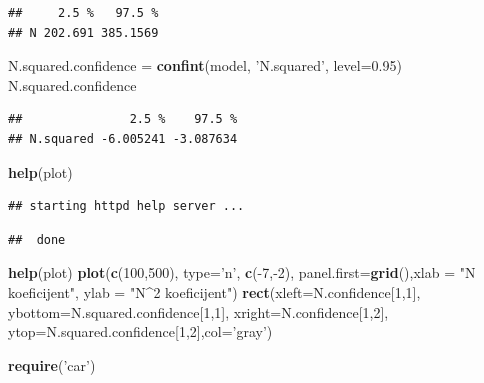 \documentclass[]{article}
\newenvironment{Shaded}{\begin{snugshade}}{\end{snugshade}}
\newcommand{\KeywordTok}[1]{\textcolor[rgb]{0.13,0.29,0.53}{\textbf{{#1}}}}
\newcommand{\DataTypeTok}[1]{\textcolor[rgb]{0.13,0.29,0.53}{{#1}}}
\newcommand{\DecValTok}[1]{\textcolor[rgb]{0.00,0.00,0.81}{{#1}}}
\newcommand{\FloatTok}[1]{\textcolor[rgb]{0.00,0.00,0.81}{{#1}}}
\newcommand{\StringTok}[1]{\textcolor[rgb]{0.31,0.60,0.02}{{#1}}}
\newcommand{\NormalTok}[1]{{#1}}
\begin{document}
\begin{verbatim}
##     2.5 %   97.5 %
## N 202.691 385.1569
\end{verbatim}

\begin{Shaded}
\begin{Highlighting}[]
\NormalTok{N.squared.confidence =}\StringTok{ }\KeywordTok{confint}\NormalTok{(model, }\StringTok{'N.squared'}\NormalTok{, }\DataTypeTok{level=}\FloatTok{0.95}\NormalTok{)}
\NormalTok{N.squared.confidence}
\end{Highlighting}
\end{Shaded}

\begin{verbatim}
##               2.5 %    97.5 %
## N.squared -6.005241 -3.087634
\end{verbatim}

\begin{Shaded}
\begin{Highlighting}[]
\KeywordTok{help}\NormalTok{(plot)}
\end{Highlighting}
\end{Shaded}

\begin{verbatim}
## starting httpd help server ...
\end{verbatim}

\begin{verbatim}
##  done
\end{verbatim}

\begin{Shaded}
\begin{Highlighting}[]
\KeywordTok{help}\NormalTok{(plot)}
\KeywordTok{plot}\NormalTok{(}\KeywordTok{c}\NormalTok{(}\DecValTok{100}\NormalTok{,}\DecValTok{500}\NormalTok{), }\DataTypeTok{type=}\StringTok{'n'}\NormalTok{, }\KeywordTok{c}\NormalTok{(-}\DecValTok{7}\NormalTok{,-}\DecValTok{2}\NormalTok{), }\DataTypeTok{panel.first=}\KeywordTok{grid}\NormalTok{(),}\DataTypeTok{xlab =} \StringTok{"N koeficijent"}\NormalTok{, }\DataTypeTok{ylab =} \StringTok{"N^2 koeficijent"}\NormalTok{)}
\KeywordTok{rect}\NormalTok{(}\DataTypeTok{xleft=}\NormalTok{N.confidence[}\DecValTok{1}\NormalTok{,}\DecValTok{1}\NormalTok{], }\DataTypeTok{ybottom=}\NormalTok{N.squared.confidence[}\DecValTok{1}\NormalTok{,}\DecValTok{1}\NormalTok{], }\DataTypeTok{xright=}\NormalTok{N.confidence[}\DecValTok{1}\NormalTok{,}\DecValTok{2}\NormalTok{], }\DataTypeTok{ytop=}\NormalTok{N.squared.confidence[}\DecValTok{1}\NormalTok{,}\DecValTok{2}\NormalTok{],}\DataTypeTok{col=}\StringTok{'gray'}\NormalTok{)}

\KeywordTok{require}\NormalTok{(}\StringTok{'car'}\NormalTok{)}
\end{Highlighting}
\end{Shaded}
\end{document}
